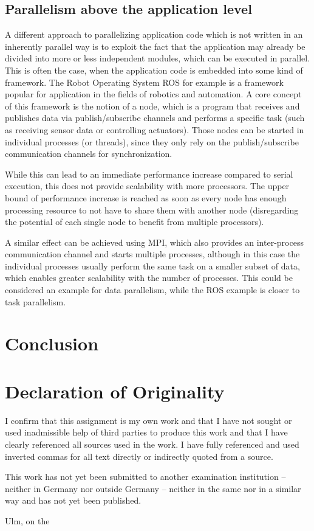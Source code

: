 \documentclass[BCOR20mm,DIV14,10pt,headinclude,footexclude,bibtotoc,liststotoc]{article}
\begin{document}
\subsection{Parallelism above the application level}
A different approach to parallelizing application code which is not written in
an inherently parallel way is to exploit the fact that the application may
already be divided into more or less independent modules, which can be executed
in parallel. This is often the case, when the application code is embedded into
some kind of framework. The Robot Operating System ROS for example is a
framework popular for application in the fields of robotics and automation. A
core concept of this framework is the notion of a node, which is a program that
receives and publishes data via publish/subscribe channels and performs a
specific task (such as receiving sensor data or controlling actuators). Those
nodes can be started in individual processes (or threads), since they only rely
on the publish/subscribe communication channels for synchronization.

While this can lead to an immediate performance increase compared to serial
execution, this does not provide scalability with more processors. The upper
bound of performance increase is reached as soon as every node has enough
processing resource to not have to share them with another node (disregarding
the potential of each single node to benefit from multiple processors).

A similar effect can be achieved using MPI, which also provides an inter-process
communication channel and starts multiple processes, although in this case the
individual processes usually perform the same task on a smaller subset of data,
which enables greater scalability with the number of processes. This could be
considered an example for data parallelism, while the ROS example is closer to
task parallelism.

\section{Conclusion}

\cleardoublepage
\section*{Declaration of Originality}

I confirm that this assignment is my own work and that I have not sought or used
inadmissible help of third parties to produce this work and that I have clearly
referenced all sources used in the work. I have fully referenced and used
inverted commas for all text directly or indirectly quoted from a source.

This work has not yet been submitted to another examination institution –
neither in Germany nor outside Germany – neither in the same nor in a similar
way and has not yet been published.

\vspace{2cm}

Ulm, on the \dotfill

\hspace{10cm} {\footnotesize \theauthor}
\end{document}

